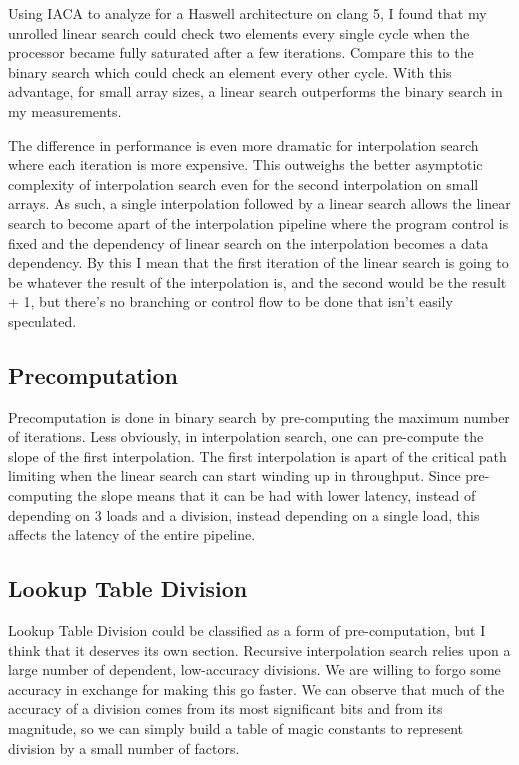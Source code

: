 \documentclass{article}
\begin{document}
Using IACA to analyze for a Haswell architecture on clang 5, I found that my unrolled linear search could check two elements every single cycle when the processor became fully saturated after a few iterations. Compare this to the binary search which could check an element every other cycle. With this advantage, for small array sizes, a linear search outperforms the binary search in my measurements.

The difference in performance is even more dramatic for interpolation search where each iteration is more expensive. This outweighs the better asymptotic complexity of interpolation search even for the second interpolation on small arrays. As such, a single interpolation followed by a linear search allows the linear search to become apart of the interpolation pipeline where the program control is fixed and the dependency of linear search on the interpolation becomes a data dependency. By this I mean that the first iteration of the linear search is going to be whatever the result of the interpolation is, and the second would be the result + 1, but there’s no branching or control flow to be done that isn’t easily speculated.

\subsection{Precomputation}
Precomputation is done in binary search by pre-computing the maximum number of iterations. Less obviously, in interpolation search, one can pre-compute the slope of the first interpolation. The first interpolation is apart of the critical path limiting when the linear search can start winding up in throughput. Since pre-computing the slope means that it can be had with lower latency, instead of depending on 3 loads and a division, instead depending on a single load, this affects the latency of the entire pipeline.

\subsection{Lookup Table Division}
Lookup Table Division could be classified as a form of pre-computation, but I think that it deserves its own section. Recursive interpolation search relies upon a large number of dependent, low-accuracy divisions. We are willing to forgo some accuracy in exchange for making this go faster. We can observe that much of the accuracy of a division comes from its most significant bits and from its magnitude, so we can simply build a table of magic constants to represent division by a small number of factors.
\end{document}
